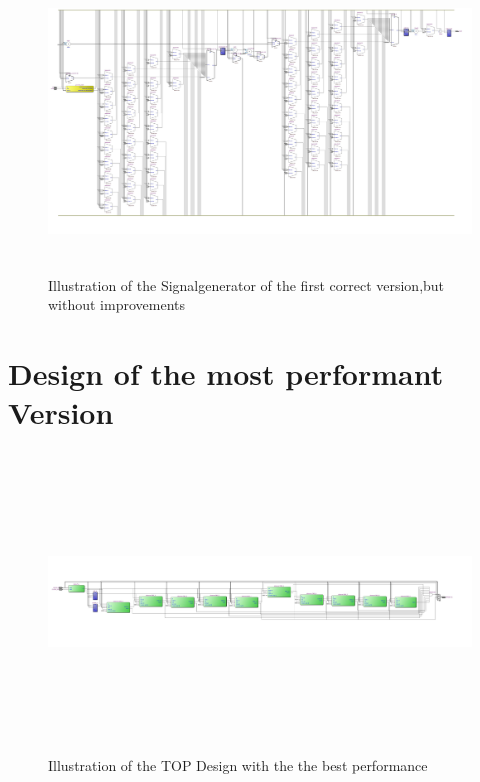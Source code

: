 \begin{figure}[]
\centering
\includegraphics[width=650px,height=300px,angle=-90]{../../pictures/20.02.2014/signalgenerator_signalgenerator_top.jpg}
\caption[Signalgenerator of the First Version]{Illustration of the Signalgenerator of the first correct version,but without improvements}
\label{fig:version:one:sig}
\end{figure}

\clearpage
\section{Design of the most performant Version}
\label{appendix:3:section:2}


\begin{figure}[]
\centering
\includegraphics[width=650px,height=300px,angle=-90]{../../pictures/13.06.2014/plain_generator/200Mhz/10OBS/TOP_only_10Observer.jpg}
\caption[TOP Design of the Final Version]{Illustration of the TOP Design with the the best performance}
\label{fig:version:final:top}
\end{figure}

